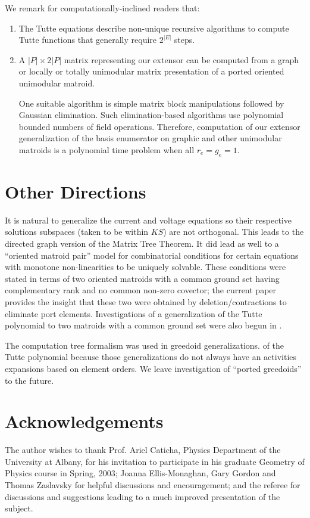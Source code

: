 \documentclass[12pt]{article}
\theoremstyle{definition}
\newcommand{\FieldK}{\ensuremath{K}}
\newcommand{\Card}[1]{\ensuremath{{\left|#1\right|}}}
\begin{document}
We remark for computationally-inclined readers that: 
\begin{enumerate}
\item The Tutte equations
describe non-unique recursive algorithms to compute Tutte functions
that generally require $2^\Card{E}$
steps. 
\item  A $\Card{P}\times 2\Card{P}$ matrix representing our
extensor 
can be computed from a 
graph or locally or totally unimodular 
matrix presentation of a ported oriented unimodular matroid.

One suitable algorithm is simple matrix block manipulations followed by
Gaussian elimination.  Such elimination-based algorithms
use polynomial bounded numbers of field operations.  Therefore, computation
of our extensor generalization of the basis enumerator on graphic
and other unimodular matroids is a polynomial time
problem when all $r_e=g_e=1$.

\end{enumerate}

\section{Other Directions}
\label{Peripheral}

It is natural to generalize the current and voltage equations 
so their respective solutions subspaces (taken to be within $\FieldK S$)
are 
not orthogonal\cite{sdcBDIMatroid}.  
This leads to the directed graph version of the Matrix Tree
Theorem.  It did lead as well to a ``oriented matroid pair'' model for 
combinatorial conditions
for certain equations with monotone non-linearities to be uniquely 
solvable\cite{sdcOMP}.  These conditions were stated in terms of
two oriented matroids with a common ground set
having complementary rank and no common non-zero covector; the current paper 
provides the insight that these two were obtained by deletion/contractions
to eliminate port elements.  Investigations of a generalization of the 
Tutte polynomial to two matroids with a common ground set were also
begun in \cite{WelshKayibiLinking}.

The computation tree formalism was used in
greedoid generalizations\cite{GordonMcMachonGreedoid}.
of the Tutte polynomial because those generalizations do not
always have an activities expansions based on element orders.
We leave investigation of ``ported greedoids'' to the future.

\section{Acknowledgements}

The author wishes to thank Prof. Ariel Caticha, Physics Department of the 
University at Albany, for his invitation to participate in his graduate
Geometry of Physics course in Spring, 2003; Joanna Ellis-Monaghan,
Gary Gordon and Thomas Zaslavsky for helpful discussions and encouragement;
and the referee for discussions and suggestions leading to a much
improved presentation of the subject.




%


\end{document}
